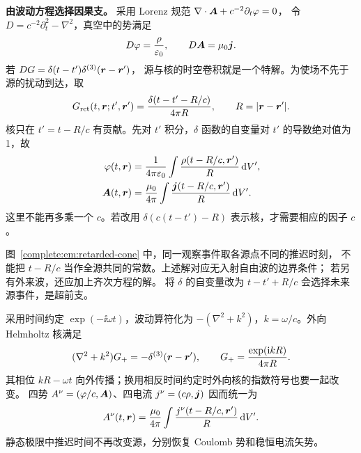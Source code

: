 \noindent\textbf{由波动方程选择因果支。}
采用 Lorenz 规范
$\nabla\cdot\bm{A}+c^{-2}\partial_t\varphi=0$，
令 $D=c^{-2}\partial_t^2-\nabla^2$，真空中的势满足
\[
 D\varphi=\frac\rho{\varepsilon_0},\qquad
 D\bm{A}=\mu_0\bm{j}.
\]
若 $D G=\delta(t-t')\delta^{(3)}(\bm{r}-\bm{r}')$，
源与核的时空卷积就是一个特解。为使场不先于源的扰动到达，取
\[
 G_{\rm ret}(t,\bm{r};t',\bm{r}')
 =\frac{\delta(t-t'-R/c)}{4\pi R},
 \qquad R=|\bm{r}-\bm{r}'|.
\]
核只在 $t'=t-R/c$ 有贡献。先对 $t'$ 积分，$\delta$ 函数的自变量对 $t'$ 的导数绝对值为1，故
\[
 \begin{aligned}
 \varphi(t,\bm{r})&=\frac1{4\pi\varepsilon_0}\int
 \frac{\rho(t-R/c,\bm{r}')}{R}\mathop{}\!\mathrm d V',\\
 \bm{A}(t,\bm{r})&=\frac{\mu_0}{4\pi}\int
 \frac{\bm{j}(t-R/c,\bm{r}')}{R}\mathop{}\!\mathrm d V'.
 \end{aligned}
\]
这里不能再多乘一个 $c$。若改用 $\delta(c(t-t')-R)$ 表示核，才需要相应的因子 $c$。

\begin{qualityfigure}
\end{qualityfigure}

图~\ref{complete:em:retarded-cone} 中，同一观察事件取各源点不同的推迟时刻，
不能把 $t-R/c$ 当作全源共同的常数。上述解对应无入射自由波的边界条件；
若另有外来波，还应加上齐次方程的解。
将 $\delta$ 的自变量改为 $t-t'+R/c$ 会选择未来源事件，是超前支。

采用时间约定 $\exp(-\ii\omega t)$，波动算符化为
$-(\nabla^2+k^2)$，$k=\omega/c$。外向 Helmholtz 核满足
\[
 (\nabla^2+k^2)G_+=-\delta^{(3)}(\bm{r}-\bm{r}'),\qquad
 G_+=\frac{\exp(\mathrm i kR)}{4\pi R}.
\]
其相位 $kR-\omega t$ 向外传播；换用相反时间约定时外向核的指数符号也要一起改变。
四势 $A^\nu=(\varphi/c,\bm{A})$、四电流 $j^\nu=(c\rho,\bm{j})$ 因而统一为
\[
 A^\nu(t,\bm{r})=\frac{\mu_0}{4\pi}\int
 \frac{j^\nu(t-R/c,\bm{r}')}{R}\mathop{}\!\mathrm d V'.
\]
静态极限中推迟时间不再改变源，分别恢复 Coulomb 势和稳恒电流矢势。

